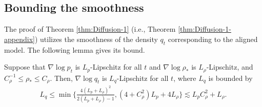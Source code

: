 \subsection{Bounding the smoothness}
The proof of Theorem \ref{thm:Diffusion-1} (i.e., Theorem \ref{thm:Diffusion-1-appendix}) utilizes the smoothness of the density $q_t$ corresponding to the aligned model. The following lemma gives its bound. 

\begin{lem}\label{lem:Smoothness}
    Suppose that $\nabla \log p_t$ is $L_p$-Lipschitz for all $t$ and $\nabla \log \rho_*$ is $L_\rho$-Lipschitz, and $C_\rho^{-1}\leq \rho_*\leq C_\rho$. 
    Then, $\nabla\log  q_t$ is $L_q$-Lipschitz for all $t$, where $L_q$ is bounded by
    \begin{align}
        L_q \leq \min \bigg\{\frac{4(L_p+L_\rho)^2}{2(L_p+L_\rho)-1}, (4+C_\rho^2) L_p + 4L_\rho\bigg\}\lesssim L_pC_\rho^2+L_\rho.
    \end{align}
\end{lem}
